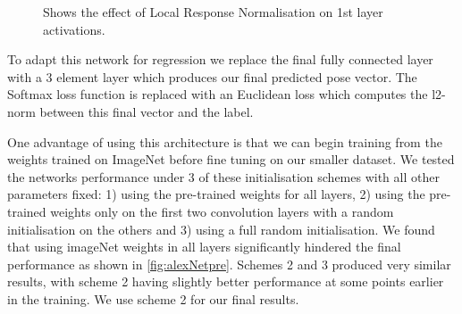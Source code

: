 \documentclass[11pt]{article} %
\begin{document}
\begin{figure}
\centering
{}%
\qquad
{}%
\caption{Shows the effect of Local Response Normalisation on 1st layer activations. }
\label{fig:LRN}
\end{figure}

To adapt this network for regression we replace the final fully connected layer with a 3 element layer which produces our final predicted pose vector. The Softmax loss function is replaced with an Euclidean loss which computes the l2-norm between this final vector and the label.

One advantage of using this architecture is that we can begin training from the weights trained on ImageNet before fine tuning on our smaller dataset. We tested the networks performance under 3 of these initialisation schemes with all other parameters fixed: 1) using the pre-trained weights for all layers, 2) using the pre-trained weights only on the first two convolution layers with a random initialisation on the others and 3) using a full random initialisation. We found that using imageNet weights in all layers significantly hindered the final performance as shown in \ref{fig:alexNetpre}. Schemes 2 and 3 produced very similar results, with scheme 2 having slightly better performance at some points earlier in the training. We use scheme 2 for our final results.
\end{document}
